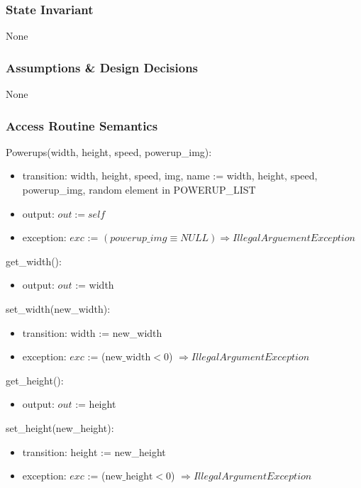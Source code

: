 \documentclass[12pt]{article}
\begin{document}
\subsubsection* {State Invariant}

None

\subsubsection* {Assumptions \& Design Decisions}

None

\subsubsection* {Access Routine Semantics}

\noindent Powerups(width, height, speed, powerup\_img):
\begin{itemize}
    \item transition: width, height, speed, img, name := width, height, speed, powerup\_img, random element in POWERUP\_LIST
    \item output: $out := self$
   \item exception: $exc$ := $(powerup\_img \equiv NULL) \Rightarrow IllegalArguementException$
\end{itemize}

\noindent get\_width():
\begin{itemize}
    \item output: $out$ := width 
\end{itemize}


\noindent set\_width(new\_width):
\begin{itemize}
    \item transition: width := new\_width 
    \item exception: $exc$ := ($\text{new\_width} < 0$) $\Rightarrow  IllegalArgumentException$
\end{itemize}

\noindent get\_height():
\begin{itemize}
    \item output: $out$ := height
\end{itemize}


\noindent set\_height(new\_height):
\begin{itemize}
    \item transition: height := new\_height
    \item exception: $exc$ := ($\text{new\_height} < 0$) $\Rightarrow  IllegalArgumentException$
\end{itemize}
\end{document}
